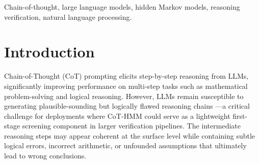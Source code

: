\documentclass[conference]{IEEEtran}
\begin{document}
\begin{abstract}
Chain-of-Thought (CoT) prompting elicits step-by-step reasoning from LLMs, yet verifying whether generated reasoning is structurally sound remains challenging. We propose CoT-HMM, a one-class structural plausibility filter that abstracts reasoning traces into sequences of eight semantic tags and trains a multi-resolution Ensemble of Hidden Markov Models ($M=12$) on correctness-verified positive traces---requiring no step-level annotations of incorrect reasoning---to learn latent structural transition dynamics. Operating at $\approx$150ms per sample on CPU, CoT-HMM targets a distinct niche from neural process reward models: structural anomaly detection rather than step-level semantic verification. Through controlled structural error injection on real LLM-generated traces (Qwen2.5-0.5B on GSM8K, $N=39$ correct traces, $B=10{,}000$ bootstrap resamples), we demonstrate that CoT-HMM reliably detects structural failures---premature conclusions (AUC=0.990 [$95\%$ CI: 0.966, 1.000]), circular reasoning loops (AUC=0.761 [$95\%$ CI: 0.645, 0.866]), and missing computation steps (AUC=0.658 [$95\%$ CI: 0.531, 0.778]). Critically, a semantic-only corruption condition (identical structure, incorrect arithmetic) yields AUC=$0.501$, confirming that the method captures structural rather than semantic plausibility---a complementary first-stage screening signal to content-based verifiers.
\end{abstract}

\begin{IEEEkeywords}
Chain-of-thought, large language models, hidden Markov models, reasoning verification, natural language processing.
\end{IEEEkeywords}

\section{Introduction}

Chain-of-Thought (CoT) prompting \cite{wei2022chain} elicits step-by-step reasoning from LLMs, significantly improving performance on multi-step tasks such as mathematical problem-solving and logical reasoning. However, LLMs remain susceptible to generating plausible-sounding but logically flawed reasoning chains \cite{ji2023survey}---a critical challenge for deployments where CoT-HMM could serve as a lightweight first-stage screening component in larger verification pipelines. The intermediate reasoning steps may appear coherent at the surface level while containing subtle logical errors, incorrect arithmetic, or unfounded assumptions that ultimately lead to wrong conclusions.
\end{document}
